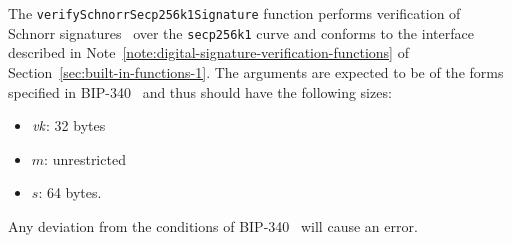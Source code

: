 \label{note:verify-schnorr-secp256k1-signature}
The \texttt{verifySchnorrSecp256k1Signature} function performs verification of
Schnorr signatures~\cite{Schnorr89, BIP-340} over the \texttt{secp256k1} curve
and conforms to the interface described in
Note~\ref{note:digital-signature-verification-functions} of
Section~\ref{sec:built-in-functions-1}.  The arguments are expected to be
of the forms specified in BIP-340~\cite{BIP-340} and thus should have the
following sizes:
\begin{itemize}
\item $\textit{vk}$: 32 bytes
\item $m$: unrestricted
\item $s$: 64 bytes.
\end{itemize}
\noindent  Any deviation from the conditions of BIP-340~\cite{BIP-340} will cause an error.
